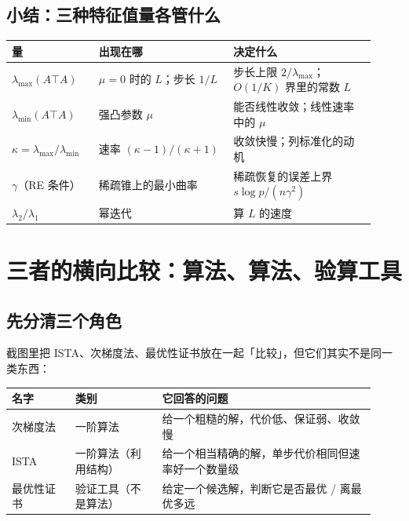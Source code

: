\documentclass[11pt,a4paper,UTF8]{ctexart}
\theoremstyle{plain}
\theoremstyle{definition}
\theoremstyle{remark}
\begin{document}
\subsection{小结：三种特征值量各管什么}

\begin{center}
\small
\begin{tabular}{@{}p{0.22\linewidth}p{0.34\linewidth}p{0.36\linewidth}@{}}
\toprule
量 & 出现在哪 & 决定什么 \\
\midrule

$\lambda_{\max}(A\top A)$ & $\mu=0$ 时的 $L$；步长 $1/L$ & 步长上限 $2/\lambda_{\max}$；$O(1/K)$ 界里的常数 $L$ \\
$\lambda_{\min}(A\top A)$ & 强凸参数 $\mu$ & 能否线性收敛；线性速率中的 $\mu$ \\
$\kappa=\lambda_{\max}/\lambda_{\min}$ & 速率 $(\kappa-1)/(\kappa+1)$ & 收敛快慢；列标准化的动机 \\
$\gamma$（RE 条件） & 稀疏锥上的最小曲率 & 稀疏恢复的误差上界 $s\log p/(n\gamma^2)$ \\
$\lambda_2/\lambda_1$ & 幂迭代 & 算 $L$ 的速度 \\
\bottomrule
\end{tabular}
\end{center}

\section{三者的横向比较：算法、算法、验算工具}

\subsection{先分清三个角色}

截图里把 ISTA、次梯度法、最优性证书放在一起「比较」，但它们其实不是同一类东西：

\begin{center}
\small
\begin{tabular}{@{}p{0.16\linewidth}p{0.22\linewidth}p{0.54\linewidth}@{}}
\toprule
名字 & 类别 & 它回答的问题\\
\midrule
次梯度法 & 一阶算法 & 给一个粗糙的解，代价低、保证弱、收敛慢\\
ISTA & 一阶算法（利用结构）& 给一个相当精确的解，单步代价相同但速率好一个数量级\\
最优性证书 & 验证工具（不是算法）& 给定一个候选解，判断它是否最优 / 离最优多远\\
\bottomrule
\end{tabular}
\end{center}
\end{document}

